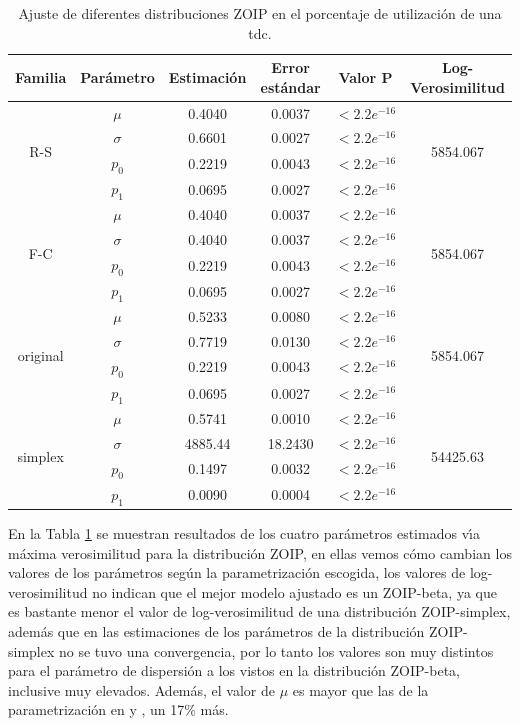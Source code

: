 \begin{table}[!hbt]
{\scriptsize
\begin{center}
\begin{tabular}{|c|c|ccc|c|}\hline
Familia & Par\'{a}metro & Estimaci\'{o}n & Error est\'{a}ndar & Valor P & Log-Verosimilitud\\ \hline

\multirow{4}{*}{R-S} &$\mu$ &0.4040	&0.0037	&$<2.2e^{-16}$ &\multirow{4}{*}{5854.067}\\
& $\sigma$ & 0.6601	&0.0027	&$<2.2e^{-16}$& \\
& $p_0$ & 0.2219	&0.0043	&$<2.2e^{-16}$ &\\
& $p_1$ & 0.0695	&0.0027	&$<2.2e^{-16}$ &\\ \hline

\multirow{4}{*}{F-C} &$\mu$ & 0.4040	&0.0037	&$<2.2e^{-16}$ &\multirow{4}{*}{5854.067}\\
& $\sigma$ & 0.4040	&0.0037	&$<2.2e^{-16}$ &\\
& $p_0$ & 0.2219	&0.0043	&$<2.2e^{-16}$ &\\
& $p_1$ & 0.0695	&0.0027	&$<2.2e^{-16}$ &\\ \hline

\multirow{4}{*}{original} &$\mu$ & 0.5233	&0.0080	&$<2.2e^{-16}$&\multirow{4}{*}{5854.067} \\
& $\sigma$ & 0.7719	&0.0130	&$<2.2e^{-16}$& \\
& $p_0$ & 0.2219	&0.0043	&$<2.2e^{-16}$& \\
& $p_1$ & 0.0695	&0.0027	&$<2.2e^{-16}$& \\ \hline

\multirow{4}{*}{simplex} &$\mu$ & 0.5741	&0.0010	&$<2.2e^{-16}$ &\multirow{4}{*}{54425.63}\\
& $\sigma$ & 4885.44	&18.2430	&$<2.2e^{-16}$ &\\
& $p_0$ & 0.1497	&0.0032	&$<2.2e^{-16}$ &\\
& $p_1$ & 0.0090	&0.0004	&$<2.2e^{-16}$ &\\ \hline

\end{tabular}
\caption{Ajuste de diferentes distribuciones ZOIP en el porcentaje de utilizaci\'{o}n de una tdc.}
\label{T_Apli_SC}
\end{center}
}
\end{table}


En la Tabla \ref{T_Apli_SC} se muestran resultados de los cuatro par\'{a}metros estimados v\'{\i}a m\'{a}xima verosimilitud para la distribuci\'{o}n ZOIP, en ellas vemos c\'{o}mo cambian los valores de los par\'{a}metros seg\'{u}n la parametrizaci\'{o}n escogida, los valores de log-verosimilitud no indican que el mejor modelo ajustado es un ZOIP-beta, ya que es bastante menor el valor de log-verosimilitud de una distribuci\'{o}n ZOIP-simplex, adem\'{a}s que en las estimaciones de los par\'{a}metros de la distribuci\'{o}n ZOIP-simplex no se tuvo una convergencia, por lo tanto los valores son muy distintos para el par\'{a}metro de dispersi\'{o}n a los vistos en la distribuci\'{o}n ZOIP-beta, inclusive muy elevados. Adem\'{a}s, el valor de $\mu$ es mayor que las de la parametrizaci\'{o}n en \cite{Stasinopoulos2} y \cite{Ferrari2}, un 17\% m\'{a}s.\\


